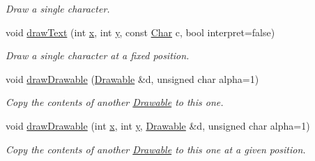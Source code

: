 \begin{DoxyCompactItemize}
\begin{DoxyCompactList}\small\item\em Draw a single character. \end{DoxyCompactList}\item 
void \hyperlink{classGUI_1_1Drawable_a2f27520ec352423f6a164843e41e0365}{draw\-Text} (int \hyperlink{classGUI_1_1Drawable_a098294925bd310aa41080a2441790b80}{x}, int \hyperlink{classGUI_1_1Drawable_a574c99954cc268937f2c66ebe1332316}{y}, const \hyperlink{namespaceGUI_af6b04b46d40197b4f00e553d7d1a3e4c}{Char} c, bool interpret=false)
\begin{DoxyCompactList}\small\item\em Draw a single character at a fixed position. \end{DoxyCompactList}\item 
void \hyperlink{classGUI_1_1Drawable_a1ccc487035a97ccfb067f663d96ad798}{draw\-Drawable} (\hyperlink{classGUI_1_1Drawable}{Drawable} \&d, unsigned char alpha=1)
\begin{DoxyCompactList}\small\item\em Copy the contents of another \hyperlink{classGUI_1_1Drawable}{Drawable} to this one. \end{DoxyCompactList}\item 
void \hyperlink{classGUI_1_1Drawable_a6aaa69d3de9eaa1611c287c6030e232b}{draw\-Drawable} (int \hyperlink{classGUI_1_1Drawable_a098294925bd310aa41080a2441790b80}{x}, int \hyperlink{classGUI_1_1Drawable_a574c99954cc268937f2c66ebe1332316}{y}, \hyperlink{classGUI_1_1Drawable}{Drawable} \&d, unsigned char alpha=1)
\begin{DoxyCompactList}\small\item\em Copy the contents of another \hyperlink{classGUI_1_1Drawable}{Drawable} to this one at a given position. \end{DoxyCompactList}\end{DoxyCompactItemize}
